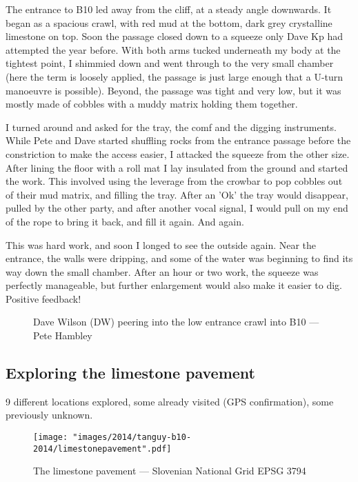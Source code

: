 The entrance to B10 led away from the cliff, at a steady angle downwards. It began as a spacious crawl, with red mud at the bottom, dark grey crystalline limestone on top. Soon the passage closed down to a squeeze only Dave Kp had attempted the year before. With both arms tucked underneath my body at the tightest point, I shimmied down and went through to the very small chamber (here the term is loosely applied, the passage is just large enough that a U-turn manoeuvre is possible). Beyond, the passage was tight and very low, but it was mostly made of cobbles with a muddy matrix holding them together. 

I turned around and asked for the tray, the comf and the digging instruments. While Pete and Dave started shuffling rocks from the entrance passage before the constriction to make the access easier, I attacked the squeeze from the other size. After lining the floor with a roll mat I lay insulated from the ground and started the work. This involved using the leverage from the crowbar to pop cobbles out of their mud matrix, and filling the tray. After an 'Ok' the tray would disappear, pulled by the other party, and after another vocal signal, I would pull on my end of the rope to bring it back, and fill it again. And again. 

This was hard work, and soon I longed to see the outside again. Near the entrance, the walls were dripping, and some of the water was beginning to find its way down the small chamber. After an hour or two work, the squeeze was perfectly manageable, but further enlargement would also make it easier to dig. Positive feedback!

\begin{figure*}[t!]
	\checkoddpage \ifoddpage \forcerectofloat \else \forceversofloat \fi
	\centering
	\label{stalactites Atlantis}
	\caption{Dave Wilson (DW) peering into the low entrance crawl into B10 --- Pete Hambley}
\end{figure*}


\subsection{Exploring the limestone pavement}
9 different locations explored, some already visited (GPS confirmation), some previously unknown.

\begin{figure}[t!]
	\checkoddpage \ifoddpage \forcerectofloat \else \forceversofloat \fi
	\centering
	
	\texttt{[image: "images/2014/tanguy-b10-2014/limestonepavement".pdf]}
	
	\label{stalactites Atlantis}
	\caption{The limestone pavement --- Slovenian National Grid EPSG 3794}
\end{figure}



